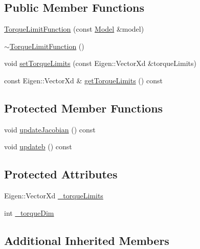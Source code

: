 \subsection*{Public Member Functions}
\begin{DoxyCompactItemize}
\item 
\hyperlink{classocra_1_1TorqueLimitFunction_a3ca04338256c4a0bf484f29dc7aeb06d}{Torque\+Limit\+Function} (const \hyperlink{classocra_1_1Model}{Model} \&model)
\item 
\hyperlink{classocra_1_1TorqueLimitFunction_a810eb8dd094bb809859a6adf9c6c4a18}{$\sim$\+Torque\+Limit\+Function} ()
\item 
void \hyperlink{classocra_1_1TorqueLimitFunction_a038250b745913584724401ea719177a5}{set\+Torque\+Limits} (const Eigen\+::\+Vector\+Xd \&torque\+Limits)
\item 
const Eigen\+::\+Vector\+Xd \& \hyperlink{classocra_1_1TorqueLimitFunction_ad31fa43f33245bbd17f5875d882e4a6d}{get\+Torque\+Limits} () const 
\end{DoxyCompactItemize}
\subsection*{Protected Member Functions}
\begin{DoxyCompactItemize}
\item 
void \hyperlink{classocra_1_1TorqueLimitFunction_a05595b1a380ee3a69afdf5cb472468a9}{update\+Jacobian} () const 
\item 
void \hyperlink{classocra_1_1TorqueLimitFunction_a211707ede54d78fbdef43a23aa4dfbef}{updateb} () const 
\end{DoxyCompactItemize}
\subsection*{Protected Attributes}
\begin{DoxyCompactItemize}
\item 
Eigen\+::\+Vector\+Xd \hyperlink{classocra_1_1TorqueLimitFunction_a929154bb1273971f123d12ce810fd375}{\+\_\+torque\+Limits}
\item 
int \hyperlink{classocra_1_1TorqueLimitFunction_ae7eed81decd37aa8bb6baeb47c5fb4d0}{\+\_\+torque\+Dim}
\end{DoxyCompactItemize}
\subsection*{Additional Inherited Members}


